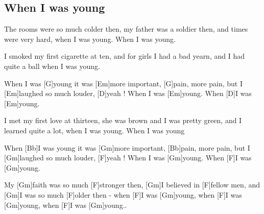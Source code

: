 \subsection*{When I was young   }
\begin{guitar}
The rooms were so much colder then, my father was a soldier then,
and times were very hard, when I was young.   When I was young.

I smoked my first cigarette at ten, and for girls I had a bad yearn,
and I had quite a ball when I was young.\qquad{}



When I was [G]young it was [Em]more important,
[G]pain, more pain, but I [Em]laughed so much louder, [D]yeah !
When I was [Em]young.    When [D]I was [Em]young.


 
I met my first love at thirteen, she was brown and I was pretty green,
and I learned quite a lot, when I was young.   When I was young






When [Bb]I was young it was [Gm]more important,
[Bb]pain, more pain, but I [Gm]laughed so much louder, [F]yeah !
When I was [Gm]young.    When [F]I was [Gm]young.



My [Gm]faith was so much [F]stronger then, [Gm]I believed in [F]fellow men,
and [Gm]I was so much [F]older then -
when [F]I was [Gm]young,     
when [F]I was [Gm]young,     
when [F]I was [Gm]young..
\end{guitar}
